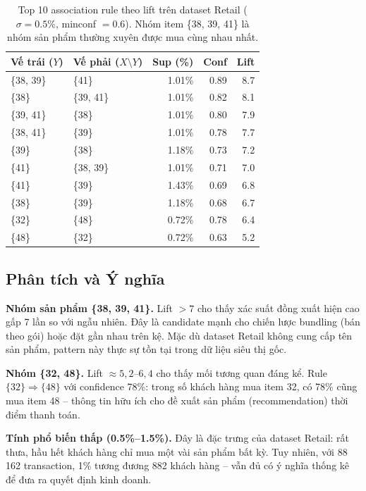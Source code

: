 \documentclass[12pt,a4paper]{article}
\theoremstyle{definition}
\begin{document}
\begin{table}[H]
\centering
\small
\begin{tabular}{l l r r r}
    \toprule
    \textbf{Vế trái ($Y$)} & \textbf{Vế phải ($X \setminus Y$)} & \textbf{Sup (\%)} & \textbf{Conf} & \textbf{Lift} \\
    \midrule
    \{38, 39\}     & \{41\}    & 1.01\% & 0.89 & 8.7 \\
    \{38\}         & \{39, 41\} & 1.01\% & 0.82 & 8.1 \\
    \{39, 41\}     & \{38\}    & 1.01\% & 0.80 & 7.9 \\
    \{38, 41\}     & \{39\}    & 1.01\% & 0.78 & 7.7 \\
    \{39\}         & \{38\}    & 1.18\% & 0.73 & 7.2 \\
    \{41\}         & \{38, 39\} & 1.01\% & 0.71 & 7.0 \\
    \{41\}         & \{39\}    & 1.43\% & 0.69 & 6.8 \\
    \{38\}         & \{39\}    & 1.18\% & 0.68 & 6.7 \\
    \{32\}         & \{48\}    & 0.72\% & 0.78 & 6.4 \\
    \{48\}         & \{32\}    & 0.72\% & 0.63 & 5.2 \\
    \bottomrule
\end{tabular}
\caption{Top 10 association rule theo lift trên dataset Retail ($\sigma = 0.5\%$, minconf $= 0.6$). Nhóm item \{38, 39, 41\} là nhóm sản phẩm thường xuyên được mua cùng nhau nhất.}
\label{tab:top_rules}
\end{table}

\subsection{Phân tích và Ý nghĩa}

\textbf{Nhóm sản phẩm \{38, 39, 41\}.} Lift $> 7$ cho thấy xác suất đồng xuất hiện cao gấp 7 lần so với ngẫu nhiên. Đây là candidate mạnh cho chiến lược bundling (bán theo gói) hoặc đặt gần nhau trên kệ. Mặc dù dataset Retail không cung cấp tên sản phẩm, pattern này thực sự tồn tại trong dữ liệu siêu thị gốc.

\textbf{Nhóm \{32, 48\}.} Lift $\approx 5{,}2$--$6{,}4$ cho thấy mối tương quan đáng kể. Rule $\{32\} \Rightarrow \{48\}$ với confidence 78\%: trong số khách hàng mua item 32, có 78\% cũng mua item 48 -- thông tin hữu ích cho đề xuất sản phẩm (recommendation) thời điểm thanh toán.

\textbf{Tính phổ biến thấp (0.5\%--1.5\%).} Đây là đặc trưng của dataset Retail: rất thưa, hầu hết khách hàng chỉ mua một vài sản phẩm bất kỳ. Tuy nhiên, với 88\,162 transaction, 1\% tương đương 882 khách hàng -- vẫn đủ có ý nghĩa thống kê để đưa ra quyết định kinh doanh.
\end{document}
